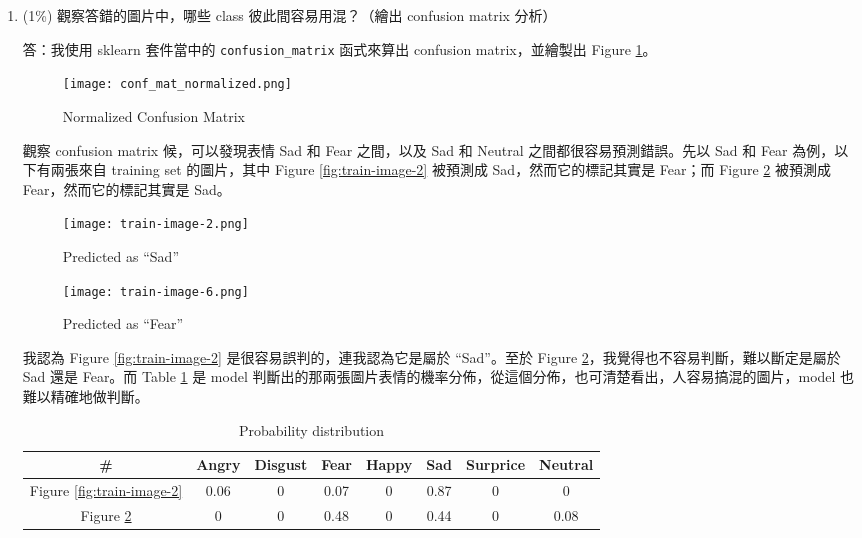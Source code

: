 \documentclass[12pt,a4paper]{extarticle}
\begin{document}
\begin{enumerate}
  \newpage

	\item (1\%) 觀察答錯的圖片中，哪些 class 彼此間容易用混？（繪出 confusion matrix 分析）
	\par 答：我使用 sklearn 套件當中的 \texttt{confusion\_matrix} 函式來算出 confusion matrix，並繪製出 Figure \ref{fig:confusioin-matrix}。

  \begin{figure}
    \centering
    \texttt{[image: conf\_mat\_normalized.png]}
    \caption{Normalized Confusion Matrix}
    \label{fig:confusioin-matrix}
  \end{figure}

  \par 觀察 confusion matrix 候，可以發現表情 Sad 和 Fear 之間，以及 Sad 和 Neutral 之間都很容易預測錯誤。先以 Sad 和 Fear 為例，以下有兩張來自 training set 的圖片，其中 Figure \ref{fig:train-image-2} 被預測成 Sad，然而它的標記其實是 Fear；而 Figure \ref{fig:train-image-6} 被預測成 Fear，然而它的標記其實是 Sad。

  \begin{figure}
      \texttt{[image: train-image-2.png]}
      \caption{Predicted as ``Sad''}
      \label{fig:train-image-2}
    \endminipage\hfill
      \texttt{[image: train-image-6.png]}
      \caption{Predicted as ``Fear''}
      \label{fig:train-image-6}
    \endminipage
  \end{figure}

  \par 我認為 Figure \ref{fig:train-image-2} 是很容易誤判的，連我認為它是屬於 ``Sad''。至於 Figure \ref{fig:train-image-6}，我覺得也不容易判斷，難以斷定是屬於 Sad 還是 Fear。而 Table \ref{tab:prob-distribution} 是 model 判斷出的那兩張圖片表情的機率分佈，從這個分佈，也可清楚看出，人容易搞混的圖片，model 也難以精確地做判斷。

  \begin{table}
    \centering
    \caption{Probability distribution}
    \label{tab:prob-distribution}
    \begin{tabular}{|c|c|c|c|c|c|c|c|}\hline
    \# & Angry & Disgust & Fear & Happy & Sad & Surprice & Neutral \\\hline
    Figure \ref{fig:train-image-2} & 0.06 & 0 & 0.07 & 0 & 0.87 & 0 & 0 \\\hline
    Figure \ref{fig:train-image-6} & 0 & 0 & 0.48 & 0 & 0.44 & 0 & 0.08 \\\hline
    \end{tabular}
  \end{table}


\end{enumerate}
\end{document}
